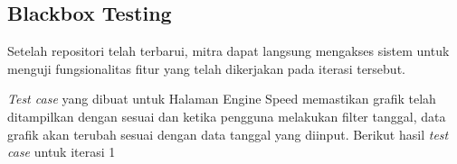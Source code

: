 \begin{landscape}

    \subsection{Blackbox Testing}

    Setelah repositori telah terbarui, mitra dapat langsung mengakses sistem untuk menguji fungsionalitas fitur yang telah dikerjakan pada iterasi tersebut.

    

    \textit{Test case} yang dibuat untuk Halaman Engine Speed memastikan grafik telah ditampilkan dengan sesuai dan ketika pengguna melakukan filter tanggal, data grafik akan terubah sesuai dengan data tanggal yang diinput. Berikut hasil \textit{test case} untuk iterasi 1

    
\end{landscape}







